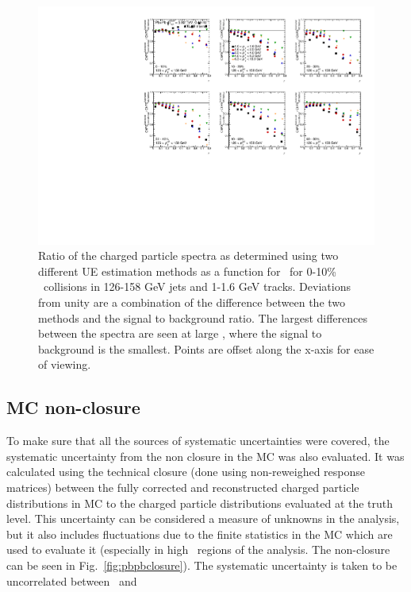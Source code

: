 \begin{figure}
\centerline{\includegraphics[page=2,width=1.\textwidth]{figures/main/systematics/ChPS_UE_Comparison}}
    \caption{Ratio of the charged particle spectra as determined using two different UE estimation methods as a function for \rvar\ for 0-10\% \pbpb\ collisions in 126-158 GeV jets and 1-1.6 GeV tracks. Deviations from unity are a combination of the difference between the two methods and the signal to background ratio.  The largest differences between the spectra are seen at large \rvar, where the signal to background is the smallest. Points are offset along the x-axis for ease of viewing.}
    \label{fig:conemethod_chps_comparison}
\end{figure}

\subsection{MC non-closure}
To make sure that all the sources of systematic uncertainties were covered, the systematic uncertainty from the non closure in the MC was also evaluated. It was 
calculated using the technical closure (done using non-reweighed response matrices) between the fully corrected and reconstructed charged particle distributions in MC to the charged particle distributions
evaluated at the truth level. 
This uncertainty can be considered a measure of unknowns in the analysis, but it also includes fluctuations due to 
the finite statistics in the MC which are used to evaluate it (especially in high \pttrk\ regions of
the analysis. The non-closure can be seen in Fig.~\ref{fig:pbpbclosure}).  
The systematic uncertainty is taken to be uncorrelated between \pbpb\ and \pp 


